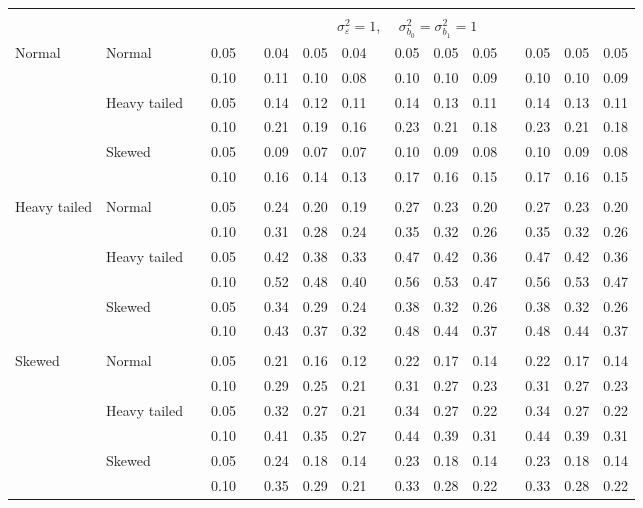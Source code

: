 \documentclass{article} %
\begin{document}
\begin{table}[ht]
\begin{scriptsize}
\begin{center}
\begin{tabular}{ll p{.1cm} c p{.1cm} rrr p{.1cm} rrr p{.1cm} rrr}
&&&&&&&&&&&&&&&\\
& && && \multicolumn{9}{c}{$\sigma_{\varepsilon}^2 = 1$, \ \ $\sigma_{b_0}^2 = \sigma_{b_1}^2 = 1$} \\ \cline{6-16}
\rowcolor{gray!20}Normal       & Normal       && 0.05 &&   0.04 & 0.05 & 0.04 && 0.05 & 0.05 & 0.05 && 0.05 & 0.05 & 0.05 \\ 
\rowcolor{gray!20}             &              && 0.10 &&   0.11 & 0.10 & 0.08 && 0.10 & 0.10 & 0.09 && 0.10 & 0.10 & 0.09 \\ 
\rowcolor{gray!20}             & Heavy tailed && 0.05 &&   0.14 & 0.12 & 0.11 && 0.14 & 0.13 & 0.11 && 0.14 & 0.13 & 0.11 \\ 
\rowcolor{gray!20}             &              && 0.10 &&   0.21 & 0.19 & 0.16 && 0.23 & 0.21 & 0.18 && 0.23 & 0.21 & 0.18 \\ 
\rowcolor{gray!20}             & Skewed       && 0.05 &&   0.09 & 0.07 & 0.07 && 0.10 & 0.09 & 0.08 && 0.10 & 0.09 & 0.08 \\ 
\rowcolor{gray!20}             &              && 0.10 &&   0.16 & 0.14 & 0.13 && 0.17 & 0.16 & 0.15 && 0.17 & 0.16 & 0.15 \\ 
             &&&&&&&&&&&&&&&\\
Heavy tailed & Normal       && 0.05 &&   0.24 & 0.20 & 0.19 && 0.27 & 0.23 & 0.20 && 0.27 & 0.23 & 0.20 \\ 
             &              && 0.10 &&   0.31 & 0.28 & 0.24 && 0.35 & 0.32 & 0.26 && 0.35 & 0.32 & 0.26 \\ 
             & Heavy tailed && 0.05 &&   0.42 & 0.38 & 0.33 && 0.47 & 0.42 & 0.36 && 0.47 & 0.42 & 0.36 \\ 
             &              && 0.10 &&   0.52 & 0.48 & 0.40 && 0.56 & 0.53 & 0.47 && 0.56 & 0.53 & 0.47 \\ 
             & Skewed       && 0.05 &&   0.34 & 0.29 & 0.24 && 0.38 & 0.32 & 0.26 && 0.38 & 0.32 & 0.26 \\ 
             &              && 0.10 &&   0.43 & 0.37 & 0.32 && 0.48 & 0.44 & 0.37 && 0.48 & 0.44 & 0.37 \\ 
             &&&&&&&&&&&&&&&\\
Skewed       & Normal       && 0.05 &&   0.21 & 0.16 & 0.12 && 0.22 & 0.17 & 0.14 && 0.22 & 0.17 & 0.14 \\ 
             &              && 0.10 &&   0.29 & 0.25 & 0.21 && 0.31 & 0.27 & 0.23 && 0.31 & 0.27 & 0.23 \\ 
             & Heavy tailed && 0.05 &&   0.32 & 0.27 & 0.21 && 0.34 & 0.27 & 0.22 && 0.34 & 0.27 & 0.22 \\ 
             &              && 0.10 &&   0.41 & 0.35 & 0.27 && 0.44 & 0.39 & 0.31 && 0.44 & 0.39 & 0.31 \\ 
             & Skewed       && 0.05 &&   0.24 & 0.18 & 0.14 && 0.23 & 0.18 & 0.14 && 0.23 & 0.18 & 0.14 \\ 
             &              && 0.10 &&   0.35 & 0.29 & 0.21 && 0.33 & 0.28 & 0.22 && 0.33 & 0.28 & 0.22 \\ 



\end{tabular}
\end{center}
\end{scriptsize}
\end{table}
\end{document}
